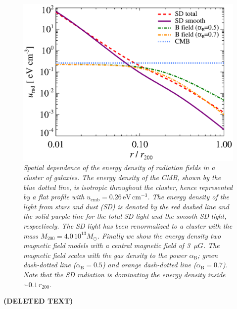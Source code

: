 \documentclass[10pt,aps,pra,reprint,amsmath,amsfonts,amssymb,showpacs]{revtex4-1}
\def\del#1{{\bf (DELETED TEXT)}}
\newcommand{\rmn}{\mathrm}
\newcommand{\msun}{M_\odot}
\newcommand{\rvir}{r_{200}}
\newcommand{\mvir}{M_{200}}
\begin{document}
\begin{figure}%
 \includegraphics[width=0.99\columnwidth]{figures/ucool.eps}
 \caption{\it Spatial dependence of the energy density of radiation
   fields in a cluster of galaxies. The energy density of the CMB,
   shown by the blue dotted line, is isotropic throughout the cluster,
   hence represented by a flat profile with
   $u_\rmn{cmb}=0.26\,\rmn{eV}\,\rmn{cm}^{-3}$. The energy density of
   the light from stars and dust (SD) is denoted by the red dashed
   line and the solid purple line for the total SD light and the
   smooth SD light, respectively. The SD light has been renormalized
   to a cluster with the mass $\mvir=4.0\,10^{13}\msun$. Finally we
   show the energy density two magnetic field models with a central
   magnetic field of 3~$\mu G$. The magnetic field scales with the gas
   density to the power $\alpha_\rmn{B}$; green dash-dotted line
   ($\alpha_\rmn{B}=0.5$) and orange dash-dotted line
   ($\alpha_\rmn{B}=0.7$). Note that the SD radiation is dominating
   the energy density inside $\sim0.1\,\rvir$.}
 \label{fig:SD_Edens}
\end{figure}


\del{In this section we present the formalism for the different
galaxy cluster emission components and show their contribution to the
total dark matter gamma-ray spectrum. We account for the emission
radiated both by final state radiation and inverse Compton where we
allow for upscattering through CMB, starlight, and dust.}


\end{document}
